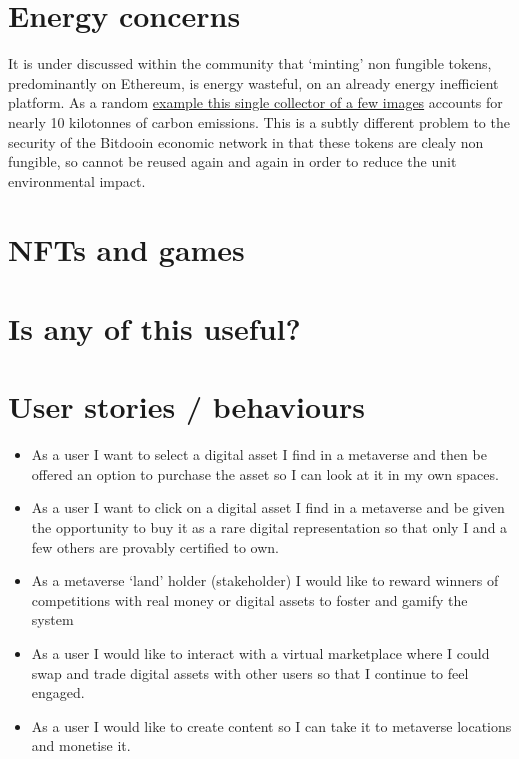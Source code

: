 \section{Energy concerns}
It is under discussed within the community that `minting' non fungible tokens, predominantly on Ethereum, is energy wasteful, on an already energy inefficient platform. As a random \href{https://carbon.fyi/?address=0x6Ec30Fd91A504Aad948839B985C7263888B2Ad68} {example this single collector of a few images} accounts for nearly 10 kilotonnes of carbon emissions. This is a subtly different problem to the security of the Bitdooin economic network in that these tokens are clealy non fungible, so cannot be reused again and again in order to reduce the unit environmental impact. 

\section{NFTs and games}

\section{Is any of this useful?}

\section{User stories / behaviours}
\label{behaviours}

\begin{itemize}
\item As a user I want to select a digital asset I find in a metaverse and then be offered an option to purchase the asset so I can look at it in my own spaces.
\item As a user I want to click on a digital asset I find in a metaverse and be given the opportunity to buy it as a rare digital representation so that only I and a few others are provably certified to own.
\item As a metaverse `land' holder (stakeholder) I would like to reward winners of competitions with real money or digital assets to foster and gamify the system
\item As a user I would like to interact with a virtual marketplace where I could swap and trade digital assets with other users so that I continue to feel engaged.
\item As a user I would like to create content so I can take it to metaverse locations and monetise it.
\end{itemize}

